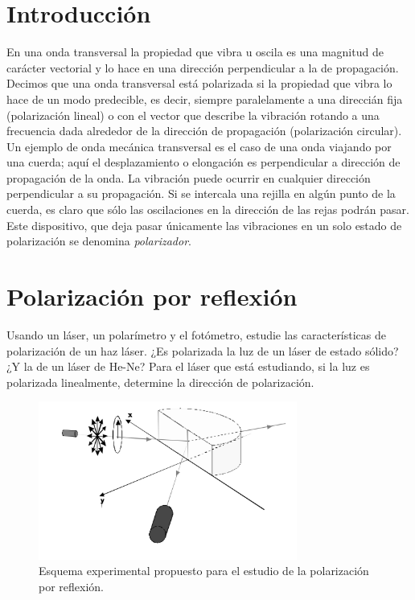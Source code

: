 \documentclass[laboratorio]{guia}
\begin{document}
\maketitle


\section{Introducción}

En una onda transversal la propiedad que vibra u oscila es una magnitud de carácter vectorial y lo hace en una dirección perpendicular a la de propagación.
Decimos que una onda transversal está polarizada si la propiedad que vibra lo hace de un modo predecible, es decir, siempre paralelamente a una direccián fija (polarización lineal) o con el vector que describe la vibración rotando a una frecuencia dada alrededor de la dirección de propagación (polarización circular).
Un ejemplo de onda mecánica transversal es el caso de una onda viajando por una cuerda; aquí el desplazamiento o elongación es perpendicular a dirección de propagación de la onda.
La vibración puede ocurrir en cualquier dirección perpendicular a su propagación. Si se intercala una rejilla en algún punto de la cuerda, es claro que sólo las oscilaciones en la dirección de las rejas podrán pasar.
Este dispositivo, que deja pasar únicamente las vibraciones en un solo estado de polarización se denomina \emph{polarizador}.


\section{Polarización por reflexión}

Usando un láser, un polarímetro y el fotómetro, estudie las características de polarización de un haz láser.
¿Es polarizada la luz de un láser de estado sólido?
¿Y la de un láser de He-Ne?
Para el láser que está estudiando, si la luz es polarizada linealmente, determine la dirección de polarización.

\begin{figure}[ht]
  \centering
  \includegraphics[width=8.5cm]{LG12--001.png}
  \caption{Esquema experimental propuesto para el estudio de la polarización por reflexión.}
  \label{fig:2}
\end{figure}
\end{document}
